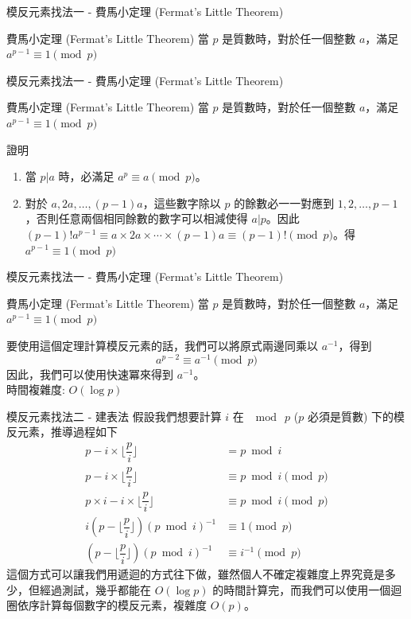 \documentclass[aspectratio=169]{beamer}
\begin{document}
\begin{frame}{模反元素找法一 - 費馬小定理 (Fermat's Little Theorem)}
    \begin{alertblock}{費馬小定理 (Fermat's Little Theorem)}
        當 $p$ 是質數時，對於任一個整數 $a$，滿足 $a^{p-1} \equiv 1 \pmod p$
    \end{alertblock}
\end{frame}

\begin{frame}{模反元素找法一 - 費馬小定理 (Fermat's Little Theorem)}
    \begin{alertblock}{費馬小定理 (Fermat's Little Theorem)}
        當 $p$ 是質數時，對於任一個整數 $a$，滿足 $a^{p-1} \equiv 1 \pmod p$
    \end{alertblock}
    \begin{block}{證明}
        \begin{enumerate}
            \item 當 $p|a$ 時，必滿足 $a^p \equiv a \pmod p$。
            \item 對於 $a,2a,\ldots,(p-1)a$，這些數字除以 $p$ 的餘數必一一對應到 $1,2,\ldots,p-1$，否則任意兩個相同餘數的數字可以相減使得 $a|p$。因此 $(p-1)!a^{p-1} \equiv a \times 2a \times \cdots \times (p-1)a \equiv (p-1)! \pmod p$。得 $a^{p-1}\equiv 1 \pmod p$
        \end{enumerate}
    \end{block}
\end{frame}

\begin{frame}{模反元素找法一 - 費馬小定理 (Fermat's Little Theorem)}
    \begin{alertblock}{費馬小定理 (Fermat's Little Theorem)}
        當 $p$ 是質數時，對於任一個整數 $a$，滿足 $a^{p-1} \equiv 1 \pmod p$
    \end{alertblock}
    要使用這個定理計算模反元素的話，我們可以將原式兩邊同乘以 $a^{-1}$，得到 
    $$a^{p-2} \equiv a^{-1} \pmod p$$
    因此，我們可以使用快速冪來得到 $a^{-1}$。\\
    時間複雜度: $O(\log p)$
\end{frame}

\begin{frame}{模反元素找法二 - 建表法}
    假設我們想要計算 $i$ 在 $\mod \ p$ ($p$ 必須是質數) 下的模反元素，推導過程如下
    \begin{align*}
        p - i \times \Big \lfloor \dfrac{p}{i} \Big \rfloor&= p \bmod i \\
        p - i \times \Big \lfloor \dfrac{p}{i} \Big \rfloor &\equiv p \bmod i \pmod p \\
        p \times i - i \times \Big \lfloor \dfrac{p}{i} \Big \rfloor &\equiv p \bmod i \pmod p \\
        i(p - \Big \lfloor \dfrac{p}{i} \Big \rfloor)(p \bmod i)^{-1} &\equiv 1 \pmod p \\
        (p - \Big \lfloor \dfrac{p}{i} \Big \rfloor)(p \bmod i)^{-1} &\equiv i^{-1} \pmod p 
    \end{align*}
    這個方式可以讓我們用遞迴的方式往下做，雖然個人不確定複雜度上界究竟是多少，但經過測試，幾乎都能在 $O(\log p)$ 的時間計算完，而我們可以使用一個迴圈依序計算每個數字的模反元素，複雜度 $O(p)$。
\end{frame}
\end{document}
